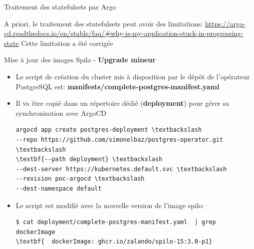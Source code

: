 
\begin{frame}[fragile]{Traitement des statefulsets par Argo}

   A priori, le traitement des statefulsets peut avoir des limitations:
   \url{https://argo-cd.readthedocs.io/en/stable/faq/#why-is-my-application-stuck-in-progressing-state}
   Cette limitation a été corrigée

\end{frame}


\begin{frame}[fragile]{Mise à jour des images Spilo - \textbf{Upgrade mineur}}

   \begin{itemize}
      \item Le script de création du cluster mis à disposition par le dépôt de l'opérateur PostgreSQL est: \textbf{manifests/complete-postgres-manifest.yaml}
      \item Il va être copié dans un répertoire dédié (\textbf{deployment}) pour gérer sa synchronisation avec ArgoCD
\begin{tiny}
\begin{Verbatim}[commandchars=\\\{\}]
argocd app create postgres-deployment \textbackslash
--repo https://github.com/simonelbaz/postgres-operator.git \textbackslash
\textbf{--path deployment} \textbackslash
--dest-server https://kubernetes.default.svc \textbackslash
--revision poc-argocd \textbackslash
--dest-namespace default
\end{Verbatim}
\end{tiny}
      \item Le script est modifié avec la nouvelle version de l'image spilo:
\begin{tiny}
\begin{Verbatim}[commandchars=\\\{\}]
$ cat deployment/complete-postgres-manifest.yaml  | grep dockerImage
\textbf{  dockerImage: ghcr.io/zalando/spilo-15:3.0-p1}
\end{Verbatim}
\end{tiny}
   \end{itemize}

\end{frame}


